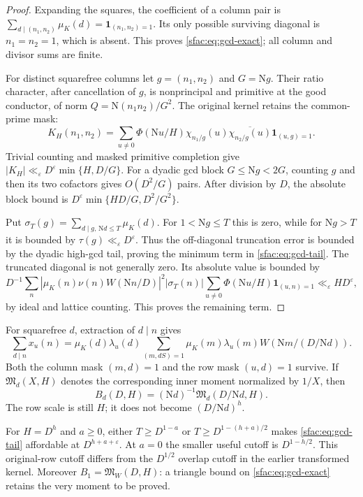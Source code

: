 \documentclass[11pt]{article}
\numberwithin{equation}{section}
\theoremstyle{definition}
\theoremstyle{remark}
\newcommand{\N}{\mathrm N}
\begin{document}
\begin{proof}
Expanding the squares, the coefficient of a column pair is
$\sum_{d\mid(n_1,n_2)}\mu_K(d)=\mathbf1_{(n_1,n_2)=1}$.
Its only possible surviving diagonal is $n_1=n_2=1$, which is absent.
This proves \eqref{sfac:eq:gcd-exact}; all column and divisor sums are finite.

For distinct squarefree columns let $g=(n_1,n_2)$ and $G=\N g$.
Their ratio character, after cancellation of $g$, is nonprincipal and
primitive at the good conductor, of norm
$Q=\N(n_1n_2)/G^2$.  The original kernel retains the common-prime mask:
\[
 K_H(n_1,n_2)=\sum_{u\ne0}\Phi(\N u/H)
  \chi_{n_1/g}(u)\overline{\chi_{n_2/g}(u)}
  \mathbf1_{(u,g)=1}.
\]
Trivial counting and masked primitive completion give
$|K_H|\ll_\varepsilon D^\varepsilon\min\{H,D/G\}$.
For a dyadic gcd block $G\le\N g<2G$, counting $g$ and then its two
cofactors gives $O(D^2/G)$ pairs.  After division by $D$, the absolute
block bound is
$D^\varepsilon\min\{HD/G,D^2/G^2\}$.

Put $\sigma_T(g)=\sum_{d\mid g,\,\N d\le T}\mu_K(d)$.
For $1<\N g\le T$ this is zero, while for $\N g>T$ it is bounded by
$\tau(g)\ll_\varepsilon D^\varepsilon$.  Thus the off-diagonal
truncation error is bounded by the dyadic high-gcd tail, proving the
minimum term in \eqref{sfac:eq:gcd-tail}.  The truncated diagonal is
not generally zero.  Its absolute value is bounded by
\[
 D^{-1}\sum_n |\mu_K(n)\nu(n)W(\N n/D)|^2|\sigma_T(n)|
       \sum_{u\ne0}\Phi(\N u/H)\mathbf1_{(u,n)=1}
 \ll_\varepsilon HD^\varepsilon,
\]
by ideal and lattice counting.  This proves the remaining term.
\end{proof}

For squarefree $d$, extraction of $d\mid n$ gives
\[
 \sum_{d\mid n}x_u(n)=\mu_K(d)\lambda_u(d)
 \sum_{(m,dS)=1}\mu_K(m)\lambda_u(m)W(\N m/(D/\N d)).
\]
Both the column mask $(m,d)=1$ and the row mask $(u,d)=1$ survive.
If $\mathfrak M_d(X,H)$ denotes the corresponding inner moment
normalized by $1/X$, then
\begin{equation}
 B_d(D,H)=(\N d)^{-1}\mathfrak M_d(D/\N d,H).
 \label{sfac:eq:gcd-scale}
\end{equation}
The row scale is still $H$; it does not become $(D/\N d)^h$.

For $H=D^h$ and $a\ge0$, either $T\ge D^{1-a}$ or
$T\ge D^{1-(h+a)/2}$ makes \eqref{sfac:eq:gcd-tail} affordable at
$D^{h+a+\varepsilon}$.  At $a=0$ the smaller useful cutoff is
$D^{1-h/2}$.  This original-row cutoff differs from the
$D^{1/2}$ overlap cutoff in the earlier transformed kernel.  Moreover
$B_1=\mathfrak M_W(D,H)$: a triangle bound on
\eqref{sfac:eq:gcd-exact} retains the very moment to be proved.
\end{document}

